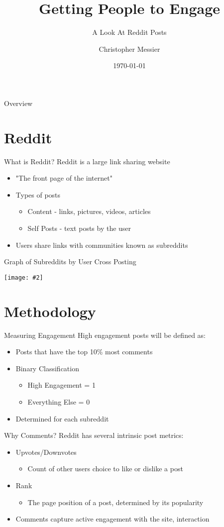 \documentclass[10pt,t]{beamer}
\title[Engagement]{Getting People to Engage}
\subtitle{A Look At Reddit Posts}
\author[Messier]{Christopher Messier}
\institute[GA]{General Assembly\\Washington, D.C.}
\date{\today}
\newcommand{\bi}{\begin{itemize}}                                 %
\newcommand{\ei}{\end{itemize}}                                   %
\newcommand*{\ig}[2]{{\centering\texttt{[image: \#2]}\par}}    %
\begin{document}
\linespread{2}

\begin{frame}
	\titlepage
\end{frame}

\begin{frame}{Overview}
	\tableofcontents
\end{frame}

\section{Reddit}
\begin{frame}{What is Reddit?}
	Reddit is a large link sharing website
	\bi 
		\item "The front page of the internet"
		\item Types of posts
			\bi
				\item Content - links, pictures, videos, articles
				\item Self Posts - text posts by the user
			\ei
		\item Users share links with communities known as subreddits
	\ei 
\end{frame}

\begin{frame}[fragile, c]{Graph of Subreddits by User Cross Posting}
	\ig{width=.75\textwidth}{subreddit_graph.png}
\end{frame}

\section{Methodology}

\begin{frame}{Measuring Engagement}
High engagement posts will be defined as:
	\bi
		\item Posts that have the top 10\% most comments 
		\item Binary Classification
			\bi
				\item High Engagement = 1
				\item Everything Else = 0
			\ei
		\item Determined for each subreddit

	\ei
\end{frame}

\begin{frame}{Why Comments?}
Reddit has several intrinsic post metrics:
	\bi
		\item Upvotes/Downvotes
			\bi
				\item Count of other users choice to like or dislike a post
			\ei
		\item Rank
			\bi
				\item The page position of a post, determined by its popularity
			\ei
		\item Comments capture active engagement with the site, interaction
	\ei
\end{frame}
\end{document}
